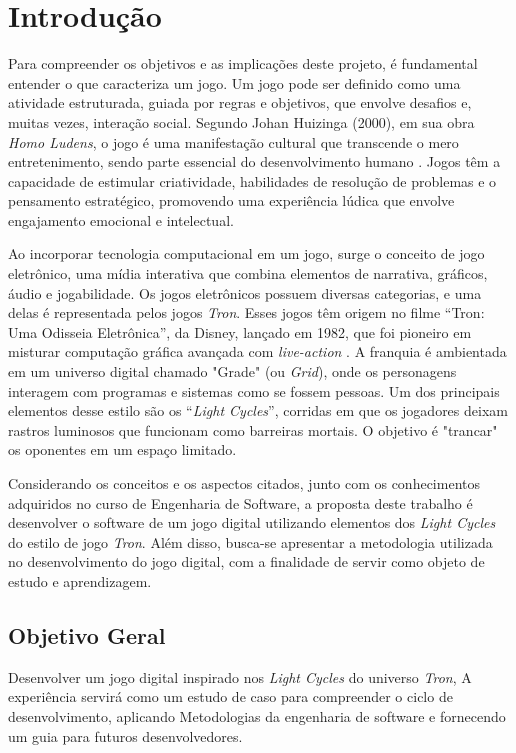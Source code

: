 \chapter[Introdução]{Introdução}

Para compreender os objetivos e as implicações deste projeto, é fundamental entender o que caracteriza um jogo. Um jogo pode ser definido como uma atividade estruturada, guiada por regras e objetivos, que envolve desafios e, muitas vezes, interação social. Segundo Johan Huizinga (2000), em sua obra \textit{Homo Ludens}, o jogo é uma manifestação cultural que transcende o mero entretenimento, sendo parte essencial do desenvolvimento humano \cite{huizinga2000}. Jogos têm a capacidade de estimular criatividade, habilidades de resolução de problemas e o pensamento estratégico, promovendo uma experiência lúdica que envolve engajamento emocional e intelectual.

Ao incorporar tecnologia computacional em um jogo, surge o conceito de jogo eletrônico, uma mídia interativa que combina elementos de narrativa, gráficos, áudio e jogabilidade. Os jogos eletrônicos possuem diversas categorias, e uma delas é representada pelos jogos \textit{Tron}. Esses jogos têm origem no filme “Tron: Uma Odisseia Eletrônica”, da Disney, lançado em 1982, que foi pioneiro em misturar computação gráfica avançada com \textit{live-action} \cite{lawrence2002}. A franquia é ambientada em um universo digital chamado "Grade" (ou \textit{Grid}), onde os personagens interagem com programas e sistemas como se fossem pessoas. Um dos principais elementos desse estilo são os “\textit{Light Cycles}”, corridas em que os jogadores deixam rastros luminosos que funcionam como barreiras mortais. O objetivo é "trancar" os oponentes em um espaço limitado.

Considerando os conceitos e os aspectos citados, junto com os conhecimentos adquiridos no curso de Engenharia de Software, a proposta deste trabalho é desenvolver o software de um jogo digital utilizando elementos dos \textit{Light Cycles} do estilo de jogo \textit{Tron}. Além disso, busca-se apresentar a metodologia utilizada no desenvolvimento do jogo digital, com a finalidade de servir como objeto de estudo e aprendizagem.

\section*{Objetivo Geral}

Desenvolver um jogo digital inspirado nos \textit{Light Cycles} do universo \textit{Tron}, A experiência servirá como um estudo de caso para compreender o ciclo de desenvolvimento, aplicando Metodologias da engenharia de software e fornecendo um guia para futuros desenvolvedores.

